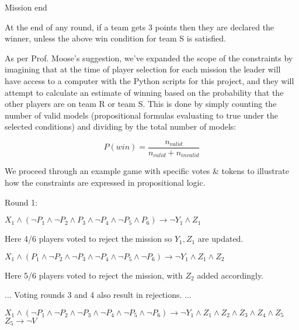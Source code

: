 \documentclass[pdftex,10pt,a4paper]{article}
\numberwithin{equation}{section} %
\begin{document}
Mission end\newline

At the end of any round, if a team gets 3 points then they are declared the \indent winner, unless the above win condition for team S is satisfied. \newline

As per Prof. Moose's suggestion, we've expanded the scope of the constraints by imagining that at the time of player selection for each mission the leader will have access to a computer with the Python scripts for this project, and they will attempt to calculate an estimate of winning based on the probability that the other players are on team R or team S. This is done by simply counting the number of valid models (propositional formulas evaluating to true under the selected conditions) and dividing by the total number of models:

\begin{equation}
	P(win)=\frac{n_{valid}}{n_{valid} + n_{invalid}}
\end{equation} \newline

We proceed through an example game with specific votes \& tokens to illustrate how the constraints are expressed in propositional logic.\newline 

Round 1:\newline

$X_1 \land (\neg P_1 \land \neg P_2 \land P_3 \land \neg P_4 \land \neg P_5 \land P_6) \rightarrow \neg Y_1 \land Z_1$ \newline

Here 4/6 players voted to reject the mission so $Y_1, Z_1$ are updated. \newline \newline

$X_1 \land (P_1 \land \neg P_2 \land \neg P_3 \land \neg P_4 \land \neg P_5 \land \neg P_6) \rightarrow \neg Y_1 \land Z_1 \land Z_2$ \newline

Here 5/6 players voted to reject the mission, with $Z_2$ added accordingly.

...\newline
\indent Voting rounds 3 and 4 also result in rejections.\newline
\indent ...\newline

$X_1 \land (\neg P_1 \land \neg P_2 \land \neg P_3 \land \neg P_4 \land \neg P_5 \land \neg P_6) \rightarrow \neg Y_1 \land Z_1 \land Z_2 \land Z_3 \land Z_4 \land Z_5$ \newline
\indent $Z_5 \rightarrow \neg V$\newline
\end{document}
